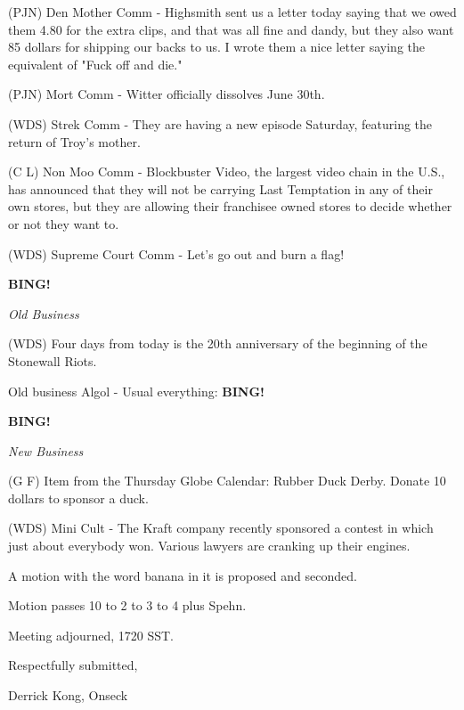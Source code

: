 \documentclass[12pt]{article}
\newcommand{\bing}{{\bf BING!} }
\newcommand{\goto}[1]{\bing \vskip 12pt \centerline{{\em{#1}}}}
\begin{document}
(PJN) Den Mother Comm - Highsmith sent us a letter today saying that we owed them 4.80 for the extra clips, and that was all fine and dandy, but they also want 85 dollars for shipping our backs to us. I wrote them a nice letter saying the equivalent of "Fuck off and die."

(PJN) Mort Comm - Witter officially dissolves June 30th.

(WDS) Strek Comm - They are having a new episode Saturday, featuring the return of Troy's mother.

(C L) Non Moo Comm - Blockbuster Video, the largest video chain in the U.S., has announced that they will not be carrying Last Temptation in any of their own stores, but they are allowing their franchisee owned stores to decide whether or not they want to.

(WDS) Supreme Court Comm - Let's go out and burn a flag!

\goto{Old Business}

(WDS) Four days from today is the 20th anniversary of the beginning of the Stonewall Riots.

Old business Algol - Usual everything: \bing

\goto{New Business}

(G F) Item from the Thursday Globe Calendar: Rubber Duck Derby. Donate 10 dollars to sponsor a duck.

(WDS) Mini Cult - The Kraft company recently sponsored a contest in which just about everybody won. Various lawyers are cranking up their engines.

A motion with the word banana in it is proposed and seconded.

Motion passes 10 to 2 to 3 to 4 plus Spehn.

\vspace{12pt}

\noindent
Meeting adjourned, 1720 SST.

\vspace{18pt}

\centerline{Respectfully submitted,}
\centerline{Derrick Kong, Onseck}
\end{document}
